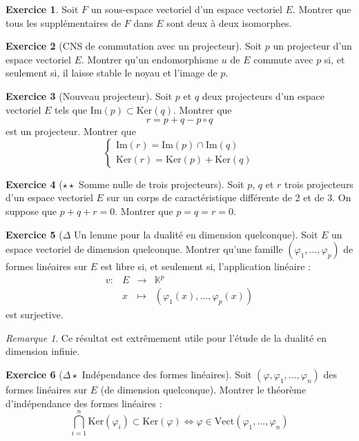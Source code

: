 \documentclass[french]{book}
\newcommand{\K}{\mathbb{K}}
\renewcommand{\ker}{\text{Ker}}
\newcommand{\im}{\text{Im}}
\theoremstyle{definition}
\newtheorem{ex}{Exercice}[chapter]
\theoremstyle{theorem}
\theoremstyle{remark}
\newtheorem*{rmq}{Remarque}
\begin{document}
\begin{ex}
	Soit $F$ un sous-espace vectoriel d'un espace vectoriel $E$. Montrer que tous les supplémentaires de $F$ dans $E$ sont deux à deux isomorphes.
\end{ex}

\begin{ex}[CNS de commutation avec un projecteur]
	Soit $p$ un projecteur d'un espace vectoriel $E$. Montrer qu'un endomorphisme $u$ de $E$ commute avec $p$ si, et seulement si, il laisse stable le noyau et l'image de $p$.
\end{ex}

\begin{ex}[Nouveau projecteur]
	Soit $p$ et $q$ deux projecteurs d'un espace vectoriel $E$ tels que $\im(p)\subset \ker(q)$. Montrer que $$r=p+q-p\circ q$$ est un projecteur. Montrer que $$\begin{cases}
		\im(r)=\im(p)\cap\im(q) \\
		\ker(r)=\ker(p)+\ker(q)
	\end{cases}$$
\end{ex}

\begin{ex}[$\star\star$ Somme nulle de trois projecteurs]
	Soit $p$, $q$ et $r$ trois projecteurs d'un espace vectoriel $E$ sur un corps de caractéristique différente de 2 et de 3. On suppose que $p+q+r=0$. Montrer que $p=q=r=0$.
\end{ex}

\begin{ex}[$\Delta$ Un lemme pour la dualité en dimension quelconque] Soit $E$ un espace vectoriel de dimension quelconque. Montrer qu'une famille $(\varphi_1,\ldots,\varphi_p)$ de formes linéaires sur $E$ est libre si, et seulement si, l'application linéaire : $$\begin{array}{lrcl}
		v:&E&\longrightarrow&\K^p \\
		&x&\longmapsto&(\varphi_1(x),\ldots,\varphi_p(x))
	\end{array}$$ est surjective.
\end{ex}

\begin{rmq}
	Ce résultat est extrêmement utile pour l'étude de la dualité en dimension infinie.

\end{rmq}

\begin{ex}[$\Delta\star$ Indépendance des formes linéaires] Soit $(\varphi,\varphi_1,\ldots,\varphi_n)$ des formes linéaires sur $E$ (de dimension quelconque). Montrer le théorème d'indépendance des formes linéaires : $$\bigcap_{i=1}^n\ker(\varphi_i)\subset \ker(\varphi)\iff\varphi\in\text{Vect}(\varphi_1,\ldots,\varphi_n)$$
\end{ex}
\end{document}
